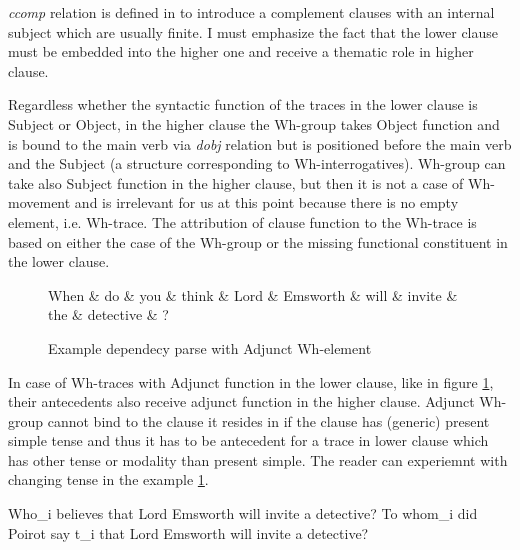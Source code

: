 \textit{ccomp} relation is defined in \cite{Marneffe2008} to introduce a complement clauses with an internal subject which are usually finite. I must emphasize the fact that the lower clause must be embedded into the higher one and receive a thematic role in higher clause.

Regardless whether the syntactic function of the traces in the lower clause is Subject or Object, in the higher clause the Wh-group takes Object function and is bound to the main verb via \textit{dobj} relation but is positioned before the main verb and the Subject (a structure corresponding to Wh-interrogatives). Wh-group can take also Subject function in the higher clause, but then it is not a case of Wh-movement and is irrelevant for us at this point because there is no empty element, i.e. Wh-trace. The attribution of clause function to the Wh-trace is based on either the case of the Wh-group or the missing functional constituent in the lower clause. 

\begin{figure}[hbtp]
	\centering
	\begin{dependency}
		\begin{deptext}[]
			When \& do \& you \& think \& Lord \& Emsworth \& will \& invite \& the \& detective \& ?\\
		\end{deptext}
	\end{dependency}
	\caption{Example dependecy parse with Adjunct Wh-element}
	\label{fig:e22}
\end{figure}

In case of Wh-traces with Adjunct function in the lower clause, like in figure \ref{fig:e22}, their antecedents also receive adjunct function in the higher clause. Adjunct Wh-group cannot bind to the clause it resides in if the clause has (generic) present simple tense and thus it has to be antecedent for a trace in lower clause which has other tense or modality than present simple. The reader can experiemnt with changing tense in the example \ref{fig:e22}. 

\begin{exe}
	\ex\label{ex:wh20} Who_{i} believes that Lord Emsworth will invite a detective?
	\ex\label{ex:wh21} To whom_{i} did Poirot say t_{i} that Lord Emsworth will invite a detective?
\end{exe}

